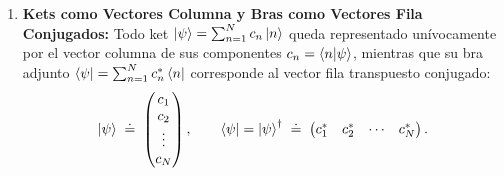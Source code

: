 \begin{enumerate}
    \item \textbf{Kets como Vectores Columna y Bras como Vectores Fila Conjugados:}
    Todo ket $\left| \psi \right\rangle = \sum_{n=1}^N c_n\left| n \right\rangle$ queda representado unívocamente por el vector columna de sus componentes $c_n = \left\langle n \middle| \psi \right\rangle$, mientras que su bra adjunto $\left\langle \psi \right| = \sum_{n=1}^N c_n^*\left\langle n \right|$ corresponde al vector fila transpuesto conjugado:
    \begin{equation}
        \left| \psi \right\rangle \;\doteq\; \begin{pmatrix} c_1 \\ c_2 \\ \vdots \\ c_N \end{pmatrix}, \qquad
        \left\langle \psi \right| = \left| \psi \right\rangle^\dagger \;\doteq\; \begin{pmatrix} c_1^* & c_2^* & \cdots & c_N^* \end{pmatrix}.
    \end{equation}


\end{enumerate}

